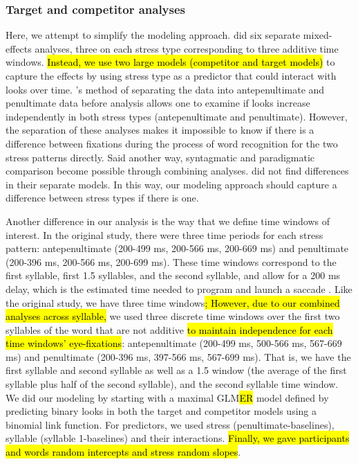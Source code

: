 \subsubsection{Target and competitor analyses}
Here, we attempt to simplify the modeling approach. \cite{Sulpizio_McQueen_2012} did six separate mixed-effects analyses, three on each stress type corresponding to three additive time windows. \hl{Instead, we use two large models (competitor and target models)} to capture the effects by using stress type as a predictor that could interact with looks over time. \cite{Sulpizio_McQueen_2012}'s method of separating the data into antepenultimate and penultimate data before analysis allows one to examine if looks increase independently in both stress types (antepenultimate and penultimate). However, the separation of these analyses makes it impossible to know if there is a difference between fixations during the process of word recognition for the two stress patterns directly. Said another way, syntagmatic and paradigmatic comparison become possible through combining analyses. \cite{Sulpizio_McQueen_2012} did not find differences in their separate models. In this way, our modeling approach should capture a difference between stress types if there is one. 

Another difference in our analysis is the way that we define time windows of interest. In the original study, there were three time periods for each stress pattern: antepenultimate (200-499 ms, 200-566 ms, 200-669 ms) and penultimate (200-396 ms, 200-566 ms, 200-699 ms). These time windows correspond to the first syllable, first 1.5 syllables, and the second syllable, and allow for a 200 ms delay, which is the estimated time needed to program and launch a saccade \citep{Matin_Shao_Boff_1993}. Like the original study, we have three time windows\hl{; However, due to our combined analyses across syllable,} we used three discrete time windows over the first two syllables of the word that are not additive \hl{to maintain independence for each time windows' eye-fixations}: antepenultimate (200-499 ms, 500-566 ms, 567-669 ms) and penultimate (200-396 ms, 397-566 ms, 567-699 ms). That is, we have the first syllable and second syllable as well as a 1.5 window (the average of the first syllable plus half of the second syllable), and the second syllable time window. We did our modeling by starting with a maximal GLM\hl{ER} model defined by predicting binary looks \citep{Barr_2008} in both the target and competitor models using a binomial link function. For predictors, we used stress (penultimate-baselines), syllable (syllable 1-baselines) and their interactions. \hl{Finally, we gave participants and words random intercepts and stress random slopes}.

